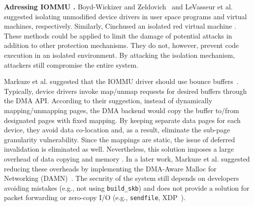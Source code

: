 \smallskip
\noindent\textbf{Adressing IOMMU \DIFdelbegin {}\DIFdelend \DIFaddbegin {}\DIFaddend .}
Boyd-Wickizer and Zeldovich~\cite{BWZ10} and LeVasseur et al.~\cite{LUSG04} suggested isolating unmodified device drivers in user space programs and virtual machines, respectively. Similarly, Cinch\DIFaddbegin {}\DIFaddend used an isolated red virtual machine \DIFdelbegin {}\DIFdelend \DIFaddbegin {}\DIFaddend . These methods could be applied to limit the damage of potential attacks in addition to other protection mechanisms. They do not, however, prevent code execution in an isolated environment. By attacking the isolation mechanism, attackers \DIFdelbegin {}\DIFdelend \DIFaddbegin {}\DIFaddend still compromise the entire system.

Markuze et al. suggested that the IOMMU driver should use bounce buffers~\cite{MMT16}. Typically, device drivers invoke map/unmap requests for desired buffers through the DMA API. According to their suggestion, instead of dynamically mapping/unmapping pages, the DMA backend would copy the buffer to/from designated pages with fixed mapping. By keeping separate data pages for each device, they avoid data co-location and, as a result, eliminate the sub-page granularity vulnerability. Since the mappings are static, the issue of deferred invalidation is eliminated as well. 
%
Nevertheless, this solution imposes a large overhead of data copying and memory \DIFdelbegin {}\DIFdelend \DIFaddbegin {}\DIFaddend . In a later work, Markuze et al. suggested reducing these overheads by implementing the DMA-Aware Malloc for Networking (DAMN)~\cite{MSMT18}. The security of the system still depends on developers avoiding mistakes (e.g., not using \texttt{build\_skb}) and does not provide a solution for packet forwarding or zero-copy I/O (e.g., \texttt{sendfile}, XDP~\cite{xdp}). %

